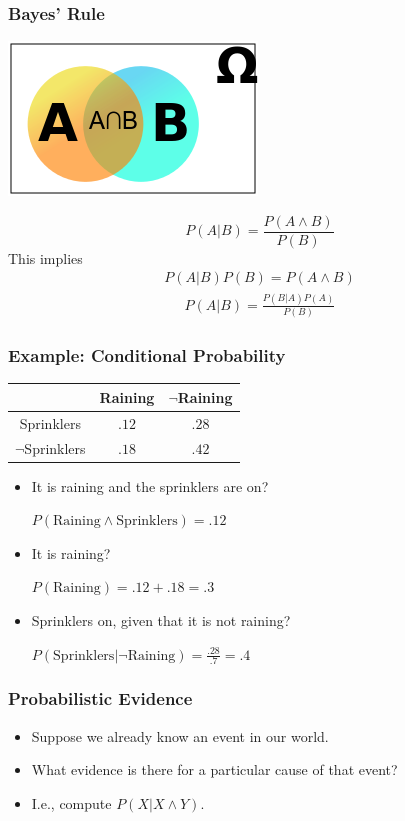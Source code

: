 \documentclass[xcolor=dvipsnames,ignorenonframetext]{beamer}
\begin{document}
\begin{frame}
  \frametitle{Bayes' Rule}
  \begin{center}
    \includegraphics[width=.4\linewidth]{Probability_venn_a_b_intersection}
  \end{center}
  \begin{equation}
    \label{eq:bayes1}
    P(A|B)=\frac{P(A\wedge B)}{P(B)}
  \end{equation}
  This implies
  \begin{eqnarray}
    \label{eq:bayes2}
    P(A|B)P(B)=P(A\wedge B)  
  \end{eqnarray}
  \begin{eqnarray}
    \label{eq:bayes3}
    P(A|B)=\frac{P(B|A)P(A)}{P(B)}
  \end{eqnarray}
\end{frame}

\begin{frame}
  \frametitle{Example: Conditional Probability} 
  \begin{tabular}{c|c|c}
    & Raining & $\neg$Raining \\\hline
    Sprinklers & $.12$ & $.28$ \\\hline
    $\neg$Sprinklers & $.18$ & $.42$ 
  \end{tabular}

  \begin{itemize}
  \item It is raining and the sprinklers are on? \\
    \centerline{$P(\mathrm{Raining} \wedge \mathrm{Sprinklers})=.12$}
  \item It is raining?\\
    \centerline{$P(\mathrm{Raining}) = .12 + .18 = .3$}
  \item Sprinklers on, given that it is not raining?\\
    \centerline{$P(\mathrm{Sprinklers}|\neg\mathrm{Raining})= \frac{.28}{.7}= .4$}
  \end{itemize}
\end{frame}

\begin{frame}
  \frametitle{Probabilistic Evidence}
  \begin{itemize}
  \item Suppose we already know an event in our world.
  \item What evidence is there for a particular cause of that event?
  \item I.e., compute $P(X|X\wedge Y)$.
  \end{itemize}
\end{frame}
\end{document}
